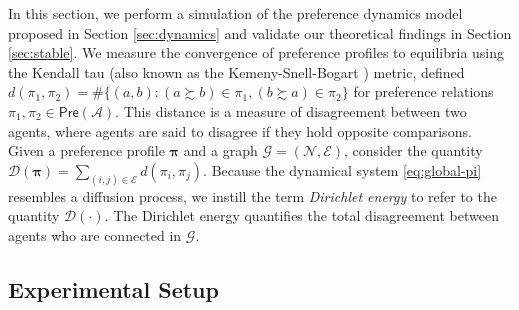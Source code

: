 \documentclass[conference]{ieeeconf}
\newcommand{\N}{\mathcal{N}}
\newcommand{\A}{\mathcal{A}}
\newcommand{\G}{\mathcal{G}}
\newcommand{\E}{\mathcal{E}}
\newcommand{\D}{\mathcal{D}}
\newcommand{\Pref}{\mathsf{Pre}}
\newcommand{\prefers}{\succsim}
\newcommand{\profile}{\boldsymbol{\pi}}
\begin{document}
In this section, we perform a simulation of the preference dynamics model proposed in Section \ref{sec:dynamics} and validate our theoretical findings in Section \ref{sec:stable}. We measure the convergence of preference profiles to equilibria using the Kendall tau \cite{kendall1938} (also known as the Kemeny-Snell-Bogart \cite{nishimura2023}) metric,
 defined $d(\pi_1,\pi_2) =  \#\{ (a,b) : (a \prefers b) \in \pi_1, (b \prefers a) \in \pi_2  \}$
for preference relations $\pi_1, \pi_2 \in \Pref(\A)$. This distance is a measure of disagreement between two agents, where agents are said to disagree if they hold opposite comparisons.
Given a preference profile $\profile$ and a graph $\G = (\N,\E)$, consider the quantity $\D(\profile) = \sum_{(i,j) \in \E} d(\pi_i,\pi_j)$.
Because the dynamical system \eqref{eq:global-pi} resembles a diffusion process, we instill the term \emph{Dirichlet energy} to refer to the quantity $\D(\cdot)$. The Dirichlet energy quantifies the total disagreement between agents who are connected in $\G$. 

\vspace{-0.25em}
\subsection{Experimental Setup}
\vspace{-0.25em}
\end{document}
